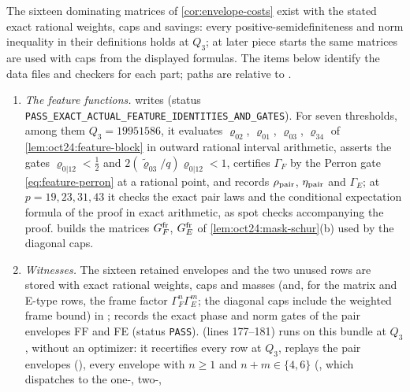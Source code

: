 \begin{certificate}\label{cert:envelopes}
\sloppy The sixteen dominating matrices of
\cref{cor:envelope-costs} exist with the stated exact rational
weights, caps and savings: every positive-semidefiniteness and
norm inequality in their definitions holds at $Q_3$; at later
piece starts the same matrices are used with caps from the
displayed formulas. The items below
identify the data files and checkers for each part; paths are
relative to .
\begin{enumerate}[label=(\alph*)]
\item \emph{The feature functions.}  writes
  (status
 \texttt{PASS\_EXACT\_ACTUAL\_FEATURE\_IDENTITIES\_AND\_GATES}). For seven thresholds,
 among them $Q_3=19951586$, it evaluates $\varrho_{02}$, $\varrho_{01}$, $\varrho_{03}$,
 $\varrho_{34}$ of \cref{lem:oct24:feature-block} in outward rational interval
 arithmetic, asserts the gates $\varrho_{0|12}<\frac12$ and $2(\tilde\varrho_{03}/q)\varrho_{0|12}<1$,
 certifies $\Gamma_F$ by the Perron gate \eqref{eq:feature-perron} at a rational point,
 and records $\rho_{\rm pair}$, $\eta_{\rm pair}$ and $\Gamma_E$; at $p=19,23,31,43$ it checks the
 exact pair laws and the conditional expectation formula of the proof in exact
 arithmetic, as spot checks accompanying the proof.
  builds the matrices
 $G^{\rm fr}_F$, $G^{\rm fr}_E$ of \cref{lem:oct24:mask-schur}(b) used by the diagonal caps.
\item \emph{Witnesses.} The sixteen retained envelopes and the two unused rows are
 stored with exact rational weights, caps and masses (and, for the matrix and E-type
 rows, the frame factor $\Gamma_F^n\Gamma_E^m$; the diagonal caps include the weighted
 frame bound) in
 ;
  records the exact
 phase and norm gates of the pair envelopes FF and FE (status \texttt{PASS}).
  (lines 177--181) runs
  on this bundle at
 $Q_3$, without an optimizer: it recertifies every row at $Q_3$, replays the pair
 envelopes (), every envelope with $n\ge1$ and
 $n+m\in\{4,6\}$ (, which dispatches to the one-, two-,

\end{enumerate}
\end{certificate}
